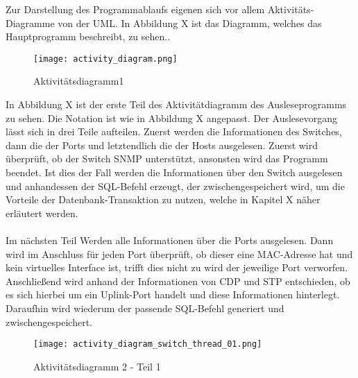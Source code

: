 Zur Darstellung des Programmablaufs eigenen sich vor allem Aktivitäts-Diagramme von der UML. In Abbildung X ist das Diagramm, welches das Hauptprogramm beschreibt, zu sehen..\\

\begin{figure}[H]
\centering
\texttt{[image: activity\_diagram.png]}
\caption{Aktivitätsdiagramm1}
\label{fig:activitydiagram1}
\end{figure}

In Abbildung X ist der erste Teil des Aktivitätdiagramm des Ausleseprogramms zu sehen.
Die Notation ist wie in Abbildung X angepasst.
Der Auslesevorgang lässt sich in drei Teile aufteilen. Zuerst werden die Informationen des Switches, dann die der Ports und letztendlich die der Hosts ausgelesen.
Zuerst wird überprüft, ob der Switch SNMP unterstützt, ansonsten wird das Programm beendet.
Ist dies der Fall werden die Informationen über den Switch ausgelesen und anhandessen der SQL-Befehl erzeugt, der zwischengespeichert wird, um die Vorteile der Datenbank-Transaktion zu nutzen, welche in Kapitel X näher erläutert werden.\\\\
Im nächsten Teil Werden alle Informationen über die Ports ausgelesen.
Dann wird im Anschluss für jeden Port überprüft, ob dieser eine MAC-Adresse hat und kein virtuelles Interface ist, trifft dies nicht zu wird der jeweilige Port verworfen.
Anschließend wird anhand der Informationen von CDP und STP entschieden, ob es sich hierbei um ein Uplink-Port handelt und diese Informationen hinterlegt. Daraufhin wird wiederum der passende SQL-Befehl generiert und zwischengespeichert.

\begin{figure}[H]
\centering
\texttt{[image: activity\_diagram\_switch\_thread\_01.png]}
\caption{Aktivitätsdiagramm 2 - Teil 1}
\label{fig:activitydiagram21}
\end{figure}


